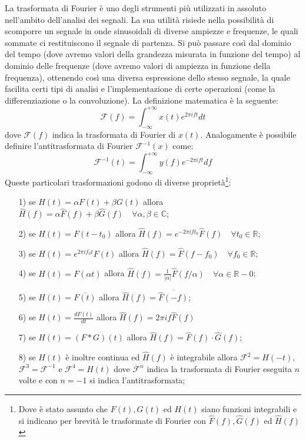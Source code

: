 \documentclass[12pt,a4paper, twoside, openright]{report}
\begin{document}
La trasformata di Fourier è uno degli strumenti più utilizzati in assoluto nell'ambito dell'analisi dei segnali.
La sua utilità risiede nella possibilità di scomporre un segnale in onde sinusoidali di diverse ampiezze e frequenze, le quali sommate ci restituiscono il segnale di partenza.
Si può passare così dal dominio del tempo (dove avremo valori della grandezza misurata in funzione del tempo) al dominio delle frequenze (dove avremo valori di ampiezza in funzione della frequenza), ottenendo così una diversa espressione dello stesso segnale, la quale facilita certi tipi di analisi e l'implementazione di certe operazioni (come la differenziazione o la convoluzione).
La definizione matematica è la seguente:
\begin{equation}
	\label{eq:Fourier}
	\mathcal{F}(f) = \int_{-\infty}^{+\infty}x(t)e^{2 \pi i f t} dt
\end{equation}
dove $\mathcal{F}(f)$ indica la trasformata di Fourier di $x(t)$.
Analogamente è possibile definire l'antitrasformata di Fourier $\mathcal{F}^{-1}(x)$ come:
\begin{equation}
	\mathcal{F}^{-1}(t) = \int_{-\infty}^{+\infty}y(f)e^{-2 \pi i f t} df
\end{equation}
Queste particolari trasformazioni godono di diverse proprietà\footnote{Dove è stato assunto che $F(t),G(t)$ ed $H(t)$ siano funzioni integrabili e si indicano per brevità le trasformate di Fourier con $\hat{F}(f), \hat{G}(f)$ ed $\hat{H}(f)$ }:
\begin{itemize}
	\item[1)] se $H(t)=\alpha F(t)+\beta G(t)$ allora $\hat{H}(f) = \alpha \hat{F}(f)+					  \beta \hat{G}(f) \quad \forall \alpha,\beta \in \mathbb{C}$;
	\item[2)] se $H(t)=F(t-t_0)$ allora $\hat{H}(f) = e^{-2\pi ift_0}\hat{F}(f) \quad 					  \forall t_0 \in \mathbb{R}$; 
	\item[3)] se $H(t)=e^{2\pi if_0t}F(t)$ allora $\hat{H}(f) = \hat{F}(f-f_0) \quad 					  \forall f_0 \in \mathbb{R}$;
	\item[4)] se $H(t) = F(\alpha t)$ allora $\hat{H}(f) = \frac{1}{|\alpha|} \hat{F}					  (f/\alpha) \quad \forall \alpha \in \mathbb{R}-{0}$;
	\item[5)] se $H(t) = \overline{F(t)}$ allora $\hat{H}(f) = \overline{ \hat{F} (-f)}					  $;
	\item[6)] se $H(t)=\frac{dF(t)}{dt}$ allora $\hat{H}(f) = 2\pi if\hat{F}(f)$
	\item[7)] se $H(t)=(F*G)(t)$ allora $\hat{H}(f) = \hat{F}(f) \cdot \hat{G}(f)$;
	\item[8)] se $H(t)$ è inoltre continua ed $\hat{H}(f)$ è integrabile allora $						  \mathcal{F}^2 = H(-t)$, $\mathcal{F}^3 = \mathcal{F}^{-1} $ e $							  \mathcal{F}^4 = H(t)$ dove $\mathcal{F}^n$ indica la trasformata di 						  Fourier eseguita $n$ volte e con $n=-1$ si indica l'antitrasformata;	
\end{itemize}
\end{document}
